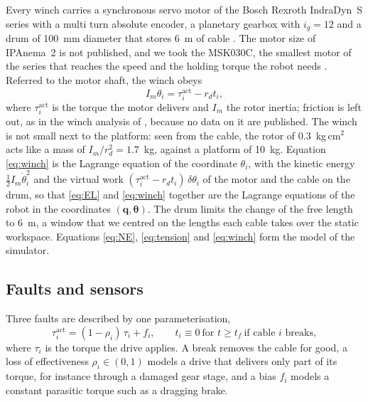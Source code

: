 \documentclass[a4paper,fleqn]{cas-dc}
\newcommand{\vc}[1]{\bm{#1}}
\begin{document}
Every winch carries a synchronous servo motor of the Bosch Rexroth IndraDyn~S series with a multi turn absolute encoder, a planetary gearbox with $i_g=12$ and a drum of 100~mm diameter that stores 6~m of cable \citep{pott2013ipanema}. The motor size of IPAnema~2 is not published, and we took the MSK030C, the smallest motor of the series that reaches the speed and the holding torque the robot needs \citep{rexroth_msk2018}. Referred to the motor shaft, the winch obeys
\begin{equation}\label{eq:winch}
I_m\ddot\theta_i=\tau_i^{\mathrm{act}}-r_d t_i,
\end{equation}
where $\tau_i^{\mathrm{act}}$ is the torque the motor delivers and $I_m$ the rotor inertia; friction is left out, as in the winch analysis of \citet{ida2022actuators}, because no data on it are published. The winch is not small next to the platform: seen from the cable, the rotor of 0.3~kg\,cm$^2$ acts like a mass of $I_m/r_d^2=1.7$~kg, against a platform of 10~kg. Equation \eqref{eq:winch} is the Lagrange equation of the coordinate $\theta_i$, with the kinetic energy $\tfrac12I_m\dot\theta_i^2$ and the virtual work $(\tau_i^{\mathrm{act}}-r_dt_i)\,\delta\theta_i$ of the motor and the cable on the drum, so that \eqref{eq:EL} and \eqref{eq:winch} together are the Lagrange equations of the robot in the coordinates $(\vc q,\vc\theta)$. The drum limits the change of the free length to 6~m, a window that we centred on the lengths each cable takes over the static workspace. Equations \eqref{eq:NE}, \eqref{eq:tension} and \eqref{eq:winch} form the model of the simulator.

\subsection{Faults and sensors}\label{sec:faults}

Three faults are described by one parameterisation,
\begin{equation}\label{eq:fault}
\tau_i^{\mathrm{act}}=(1-\rho_i)\,\tau_i+f_i,\qquad t_i\equiv0\ \text{for } t\ge t_f\ \text{if cable } i \text{ breaks},
\end{equation}
where $\tau_i$ is the torque the drive applies. A break removes the cable for good, a loss of effectiveness $\rho_i\in(0,1)$ models a drive that delivers only part of its torque, for instance through a damaged gear stage, and a bias $f_i$ models a constant parasitic torque such as a dragging brake.
\end{document}
